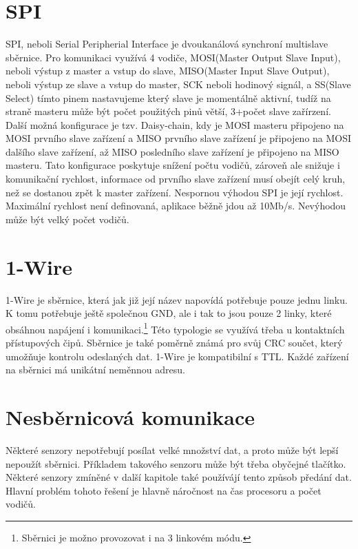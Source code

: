 \section{SPI}
SPI, neboli Serial Peripherial Interface je dvoukanálová synchroní multislave sběrnice.
Pro komunikaci využívá 4 vodiče, MOSI(Master Output Slave Input), neboli výstup z master a vstup do slave, MISO(Master Input Slave Output), neboli výstup ze slave a vstup do master, SCK neboli hodinový signál, a SS(Slave Select) tímto pinem nastavujeme který slave je momentálně aktivní, tudíž na straně masteru může být počet použitých pinů větší, 3+počet slave zařírzení.
Další možná konfigurace je tzv. Daisy-chain, kdy je  MOSI masteru připojeno na MOSI prvního slave zařízení a MISO prvního slave zařízení je připojeno na MOSI dalšího slave zařízení, až MISO posledního slave zařízení je připojeno na MISO masteru.
Tato konfigurace poskytuje snížení počtu vodičů, zároveň ale snižuje i komunikační rychlost, informace od prvního slave zařízení musí obejít celý kruh, než se dostanou zpět k master zařízení.
Nespornou výhodou SPI je její rychlost.
Maximální rychlost není definovaná, aplikace běžně jdou až 10Mb/s.
Nevýhodou může být velký počet vodičů.
\cite{nxp:AN2847}

\section{1-Wire}
1-Wire je sběrnice, která jak již její název napovídá potřebuje pouze jednu linku.
K tomu potřebuje ještě společnou GND, ale i tak to jsou pouze 2 linky, které obsáhnou napájení i komunikaci.\footnote{Sběrnici je možno provozovat i na 3 linkovém módu.}
Této typologie se využívá třeba u kontaktních přístupových čipů.
Sběrnice je také poměrně známá pro svůj CRC součet, který umožňuje kontrolu odeslaných dat.
1-Wire je kompatibilní s TTL.
Každé zařízení na sběrnici má unikátní neměnnou adresu.
\cite{one-wire}

\section{Nesběrnicová komunikace}
Některé senzory nepotřebují posílat velké množství dat, a proto může být lepší nepoužít sběrnici. 
Příkladem takového senzoru může být třeba obyčejné tlačítko.
Některé senzory zmíněné v další kapitole také používájí tento způsob předání dat.
Hlavní problém tohoto řešení je hlavně náročnost na čas procesoru a počet vodičů.

